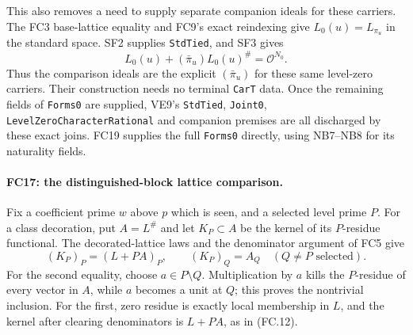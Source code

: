 \documentclass[11pt,a4paper]{article}
\numberwithin{equation}{section}
\theoremstyle{remark}\newtheorem{remark}[theorem]{Remark}
\begin{document}
This also removes a need to supply separate companion ideals for
these carriers. The FC3 base-lattice equality and FC9's exact reindexing
give $L_0(u)=L_{\pi_u}$ in the standard space. SF2 supplies
\texttt{StdTied}, and SF3 gives
\[
 L_0(u)+(\bar\pi_u)L_0(u)^\#=\mathcal O^{N_0}.
 \tag{FC.32}
\]
Thus the comparison ideals are the explicit $(\bar\pi_u)$ for these
same level-zero carriers. Their construction needs no terminal
\texttt{CarT} data. Once the remaining fields of \texttt{Forms0}
are supplied, VE9's \texttt{StdTied}, \texttt{Joint0},
\texttt{LevelZeroCharacterRational} and companion premises are all
discharged by these exact joins. FC19 supplies the full
\texttt{Forms0} directly, using NB7--NB8 for its naturality fields.

\paragraph{FC17: the distinguished-block lattice comparison.}
Fix a coefficient prime $w$ above $p$ which is seen, and a selected
level prime $P$. For a class decoration, put $A=L^\#$ and let
$K_P\subset A$ be the kernel of its $P$-residue functional.
The decorated-lattice laws and the denominator argument of FC5 give
\[
 (K_P)_P=(L+PA)_P,\qquad (K_P)_Q=A_Q
             \quad(Q\ne P\text{ selected}).          \tag{FC.33}
\]
For the second equality, choose $a\in P\setminus Q$.
Multiplication by $a$ kills the $P$-residue of every vector in $A$,
while $a$ becomes a unit at $Q$; this proves the nontrivial inclusion.
For the first, zero residue is exactly local membership in $L$,
and the kernel after clearing denominators is $L+PA$, as in (FC.12).
\end{document}
